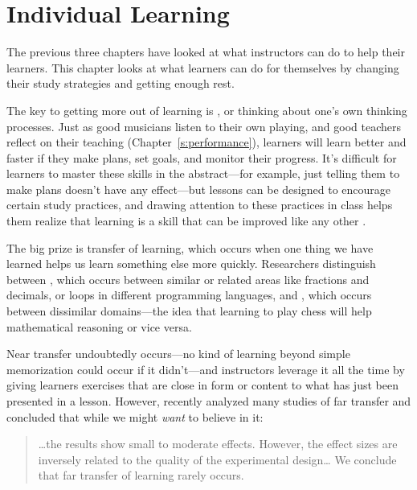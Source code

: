 \chapter{Individual Learning}\label{s:individual}

The previous three chapters have looked at what instructors can do to
help their learners. This chapter looks at what learners can do for
themselves by changing their study strategies and getting enough rest.

The key to getting more out of learning is
, or thinking about one's
own thinking processes. Just as good musicians listen to their own
playing, and good teachers reflect on their teaching
(Chapter~\ref{s:performance}), learners will learn better and faster if
they make plans, set goals, and monitor their progress. It's difficult
for learners to master these skills in the abstract---for example, just
telling them to make plans doesn't have any effect---but lessons can be
designed to encourage certain study practices, and drawing attention to
these practices in class helps them realize that learning is a skill
that can be improved like any other \cite{McGu2015,Miya2018}.

The big prize is transfer of learning, which occurs when one thing we
have learned helps us learn something else more quickly. Researchers
distinguish between , which occurs
between similar or related areas like fractions and decimals, or loops
in different programming languages, and , which occurs between dissimilar
domains---the idea that learning to play chess will help mathematical
reasoning or vice versa.

Near transfer undoubtedly occurs---no kind of learning beyond simple
memorization could occur if it didn't---and instructors leverage it all
the time by giving learners exercises that are close in form or content
to what has just been presented in a lesson. However, \cite{Sala2017}
recently analyzed many studies of far transfer and concluded that while
we might \emph{want} to believe in it:

\begin{quote}

{\ldots}the results show small to moderate effects. However, the
effect sizes are inversely related to the quality of the experimental
design{\ldots} We conclude that far transfer of learning rarely
occurs.

\end{quote}

